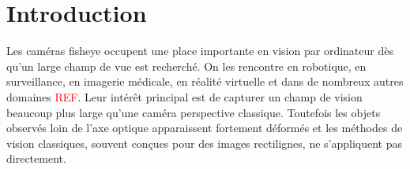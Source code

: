 \documentclass[11pt,a4paper]{article}
\begin{document}


\section{Introduction}

Les caméras fisheye occupent une place importante en vision par ordinateur dès qu'un large champ de vue est recherché. On les rencontre en robotique, en surveillance, en imagerie médicale, en réalité virtuelle et dans de nombreux autres domaines \textcolor{red}{REF}.
Leur intérêt principal est de capturer un champ de vision beaucoup plus large qu'une caméra perspective classique. Toutefois les objets observés loin de l'axe optique apparaissent fortement déformés et les méthodes de vision classiques, souvent conçues pour des images rectilignes, ne s'appliquent pas directement.
\end{document}
